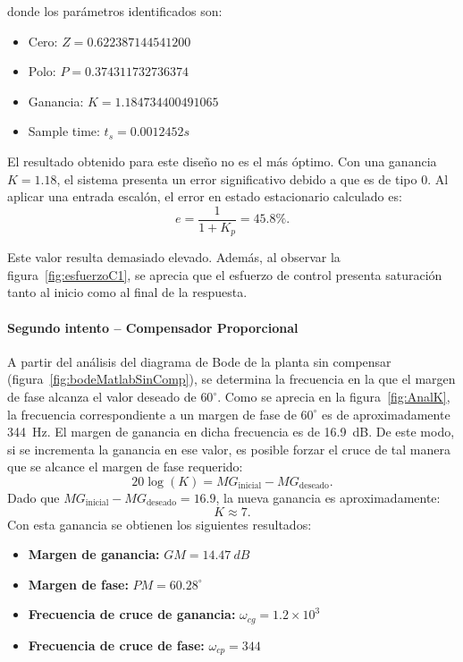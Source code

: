 \noindent
donde los parámetros identificados son:
\begin{itemize}
	\item Cero: $Z = 0.622387144541200$
	\item Polo: $P = 0.374311732736374$
	\item Ganancia: $K = 1.184734400491065$
	\item Sample time: $t_s = 0.0012452 s$
\end{itemize}




El resultado obtenido para este diseño no es el más óptimo. Con una ganancia $K = 1.18$, el sistema presenta un error significativo debido a que es de tipo $0$. Al aplicar una entrada escalón, el error en estado estacionario calculado es:
\[
e = \frac{1}{1+K_p} = 45.8\%.
\]

Este valor resulta demasiado elevado. Además, al observar la figura~\ref{fig:esfuerzoC1}, se aprecia que el esfuerzo de control presenta saturación tanto al inicio como al final de la respuesta.  

\paragraph{Segundo intento – Compensador Proporcional}  

A partir del análisis del diagrama de Bode de la planta sin compensar (figura~\ref{fig:bodeMatlabSinComp}), se determina la frecuencia en la que el margen de fase alcanza el valor deseado de $60^\circ$.
Como se aprecia en la figura~\ref{fig:AnalK}, la frecuencia correspondiente a un margen de fase de $60^\circ$ es de aproximadamente \SI{344}{Hz}. El margen de ganancia en dicha frecuencia es de \SI{16.9}{dB}. De este modo, si se incrementa la ganancia en ese valor, es posible forzar el cruce de tal manera que se alcance el margen de fase requerido:
\[
20\log(K) = MG_{\text{inicial}} - MG_{\text{deseado}}.
\]
Dado que $MG_{\text{inicial}} - MG_{\text{deseado}} = 16.9$, la nueva ganancia es aproximadamente:
\[
K \approx 7.
\]
Con esta ganancia se obtienen los siguientes resultados:
\begin{itemize}
	\item \textbf{Margen de ganancia:} $GM = \SI{14.47}{dB}$
	\item \textbf{Margen de fase:} $PM = 60.28^\circ$
	\item \textbf{Frecuencia de cruce de ganancia:} $\omega_{cg} = 1.2 \times 10^3$
	\item \textbf{Frecuencia de cruce de fase:} $\omega_{cp} = 344$
\end{itemize}

